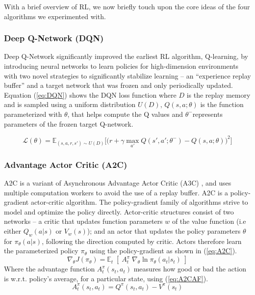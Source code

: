 \documentclass[a4paper, 12pt]{article}
\begin{document}
With a brief overview of RL, we now briefly touch upon the core ideas of the four algorithms we experimented with.

\subsubsection*{Deep Q-Network (DQN)}
Deep Q-Network \citep{DQN-mnih2013} significantly improved the earliest RL algorithm, Q-learning, by introducing neural networks to learn policies for high-dimension environments with two novel strategies to significantly stabilize learning -- an ``experience replay buffer'' and a target network that was frozen and only periodically updated. Equation (\ref{eq:DQN}) shows the DQN loss function where $D$ is the replay memory and is sampled using a uniform distribution $U(D)$, $Q(s, a; \theta)$ is the function parameterized with $\theta$, that helps compute the Q values and $\theta^{-}$represents parameters of the frozen target Q-network.

\begin{equation}
	\mathcal{L}(\theta) = \mathbb{E}_{(s, a, r, s') \sim U(D)} \Big[ \big( r + \gamma \max_{a'} Q(s', a'; \theta^{-}) - Q(s, a; \theta) \big)^2 \Big]
	\label{eq:DQN}
\end{equation}

\subsubsection*{Advantage Actor Critic (A2C)}

A2C is a variant of Asynchronous Advantage Actor Critic (A3C) \citep{A2C-mnih2016}, and uses multiple computation workers to avoid the use of a replay buffer. A2C is a policy-gradient actor-critic algorithm. The policy-gradient family of algorithms strive to model and optimize the policy directly. Actor-critic structures consist of two networks -- a critic that updates function parameters $w$ of the value function (i.e either $Q_w(a \vert s)$ or $V_w(s)$); and an actor that updates the policy parameters $\theta$for $\pi_\theta(a \vert s)$, following the direction computed by critic. Actors therefore learn the parameterized policy $\pi_{\theta}$ using the policy-gradient as shown in (\ref{eq:A2C}). 
\begin{equation}
	\nabla_ \theta J(\pi_\theta) = \mathbb{E}_t \; [ \; A^\pi_t \; \nabla_\theta \ln \pi_\theta(a_t \vert s_t) \;]
	\label{eq:A2C}
\end{equation}
Where the advantage function $A^\pi_t (s_t, a_t)$ measures how good or bad the action is w.r.t. policy's average, for a particular state, using (\ref{eq:A2CAF}).
\begin{equation}
	A^\pi_t (s_t, a_t) = Q^\pi (s_t, a_t) - V^\pi (s_t)
	\label{eq:A2CAF}
\end{equation}
\end{document}
